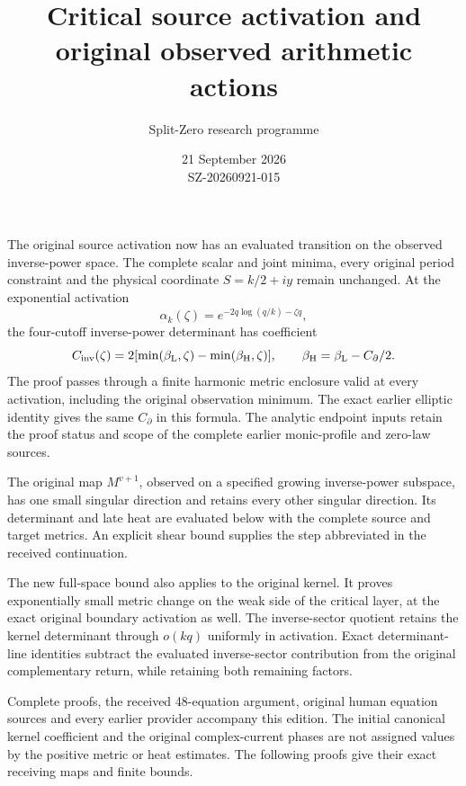 \documentclass[11pt]{article}
\title{Critical source activation and\\original observed arithmetic actions}
\author{Split-Zero research programme}
\date{21 September 2026\\SZ-20260921-015}
\begin{document}
\maketitle
The original source activation now has an evaluated transition on the
observed inverse-power space. The complete scalar and joint minima,
every original period constraint and the physical coordinate
$S=k/2+iy$ remain unchanged. At the exponential activation
\[
\alpha_k(\zeta)=e^{-2q\log(q/k)-\zeta q},
\]
the four-cutoff inverse-power determinant has coefficient
\[
C_{\rm inv}(\zeta)
=2[\min(\beta_{\rm L},\zeta)-\min(\beta_{\rm H},\zeta)],
\qquad \beta_{\rm H}=\beta_{\rm L}-C_\partial/2.
\]
The proof passes through a finite harmonic metric enclosure valid
at every activation, including the original observation minimum.
The exact earlier elliptic identity gives the same $C_\partial$
in this formula. The analytic endpoint inputs retain the proof status
and scope of the complete earlier monic-profile and zero-law sources.

The original map $M^{v+1}$, observed on a specified growing inverse-power
subspace, has one small singular direction and retains every other
singular direction. Its determinant and late heat are evaluated below
with the complete source and target metrics. An explicit shear bound
supplies the step abbreviated in the received continuation.

The new full-space bound also applies to the original kernel.
It proves exponentially small metric change on the weak side of the
critical layer, at the exact original boundary activation as well.
The inverse-sector quotient retains the kernel determinant through
$o(kq)$ uniformly in activation. Exact determinant-line identities
subtract the evaluated inverse-sector contribution from the original
complementary return, while retaining both remaining factors.

Complete proofs, the received 48-equation argument, original human
equation sources and every earlier provider accompany this edition.
The initial canonical kernel coefficient and the original complex-current
phases are not assigned values by the positive metric or heat estimates.
The following proofs give their exact receiving maps and finite bounds.
\begingroup\small\tableofcontents\endgroup\clearpage
\end{document}
